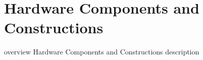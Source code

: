 \section{Hardware Components and Constructions}

overview Hardware Components and Constructions description

